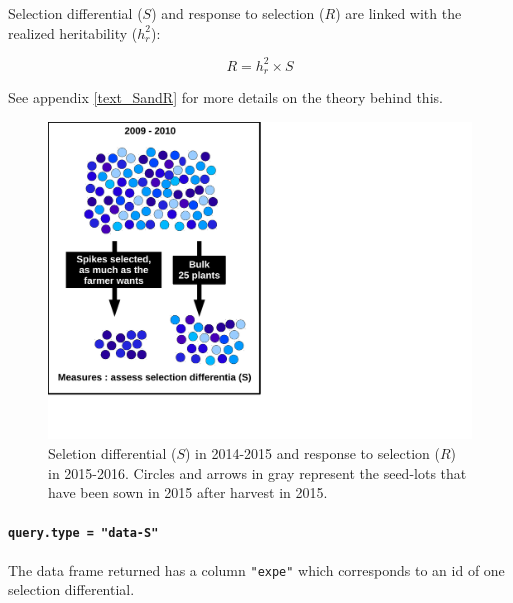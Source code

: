 \documentclass{article}\usepackage[]{graphicx}\usepackage[]{color}
\begin{document}
Selection differential ($S$) and response to selection ($R$) are linked with the realized heritability ($h_{r}^2$):

\begin{displaymath}
R = h_{r}^2 \times S
\end{displaymath}

See appendix \ref{text_SandR} for more details on the theory behind this.

\begin{figure}[H]
\begin{center}
\includegraphics[page=8, width=.8\textwidth]{SandR_EN.pdf}
\caption{Seletion differential ($S$) in 2014-2015 and response to selection ($R$) in 2015-2016. Circles and arrows in gray represent the seed-lots that have been sown in 2015 after harvest in 2015.}
\label{SandR}
\end{center}
\end{figure}



\paragraph{\texttt{query.type = "data-S"}}

The data frame returned has a column \texttt{"expe"} which corresponds to an id of one selection differential.
\end{document}
